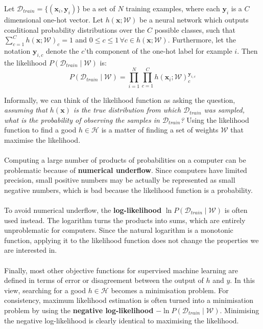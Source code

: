 \begin{definition}
	\label{likelihood}
	Let $\mathcal{D}_{train} = \{(\mathbf{x}_i, \mathbf{y}_i)\}$ be a set of $N$ training examples, where each $\mathbf{y}_i$ is a $C$ dimensional one-hot vector. Let $h(\mathbf{x}; \mathcal{W})$ be a neural network which outputs conditional probability distributions over the $C$ possible classes, such that $\sum_{c=1}^C h(\mathbf{x} ; \mathcal{W})_c = 1$ and $0 \leq c \leq 1 \,\forall c \in h(\mathbf{x};\mathcal{W})$. Furthermore, let the notation $\mathbf{y}_{i,c}$ denote the $c$'th component of the one-hot label for example $i$. Then the likelihood $P(\mathcal{D}_{train} \mid \mathcal{W})$ is:
	$$
	P(\mathcal{D}_{train} \mid \mathcal{W}) = \prod\limits_{i=1}^N\prod\limits_{c=1}^C h(\mathbf{x}_i;\mathcal{W})_c^{\mathbf{y}_{i,c}}
	$$
\end{definition}
\noindent
Informally, we can think of the likelihood function as asking the question, \textit{assuming that $h(\mathbf{x})$ is the true distribution from which $\mathcal{D}_{train}$ was sampled, what is the probability of observing the samples in $\mathcal{D}_{train}$?} Using the likelihood function to find a good $h \in \mathcal{H}$ is a matter of finding a set of weights $\mathcal{W}$ that maximise the likelihood.
\\\\ 
Computing a large number of products of probabilities on a computer can be problematic because of \textbf{numerical underflow}. Since computers have limited precision, small positive numbers may be actually be represented as small negative numbers, which is bad because the likelihood function is a probability.
\\\\
To avoid numerical underflow, the \textbf{log-likelihood} $\ln P(\mathcal{D}_{train} \mid \mathcal{W})$ is often used instead. The logarithm turns the products into sums, which are entirely unproblematic for computers. Since the natural logarithm is a monotonic function, applying it to the likelihood function does not change the properties we are interested in.
\\\\
Finally, most other objective functions for supervised machine learning are defined in terms of error or disagreement between the output of $h$ and $y$. In this view, searching for a good $h \in \mathcal{H}$ becomes a minimisation problem. For consistency, maximum likelihood estimation is often turned into a minimisation problem by using the \textbf{negative log-likelihood} $-\ln P(\mathcal{D}_{train} \mid \mathcal{W})$. Minimising the negative log-likelihood is clearly identical to maximising the likelihood.

